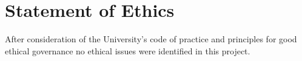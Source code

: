 \section{Statement of Ethics}
After consideration of the University's code of practice and principles for good ethical governance no ethical issues were identified in this project.
